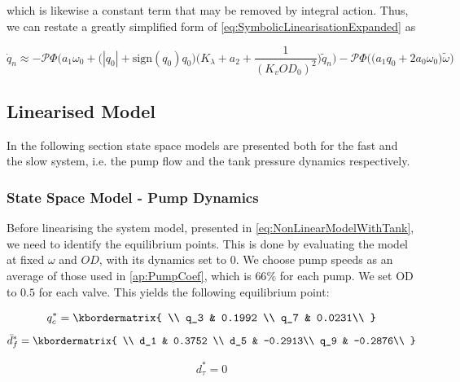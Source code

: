 which is likewise a constant term that may be removed by integral action. Thus, we can restate a greatly simplified form of \cref{eq:SymbolicLinearisationExpanded} as

\begin{equation}\label{eq:SymbolicLinearisationSimplified}
	\dot{q}_n \approx -\mathcal{P}\Phi\Bigg(a_1\omega_0 + \Big(|q_0|+\text{sign}(q_0)q_0\Big)\Bigg(K_\lambda + a_2 + \frac{1}{(K_v OD_0)^2}\Bigg) \tilde{q}_n \Bigg) -  \mathcal{P}\Phi\Bigg(\Big(a_1 q_0 + 2a_0\omega_0\Big) \tilde{\omega}\Bigg)
\end{equation}

\subsection{Linearised Model} \label{sec:LinearisedModel}
In the following section state space models are presented both for the fast and the slow system, i.e. the pump flow and the tank pressure dynamics respectively. 

\subsubsection{State Space Model - Pump Dynamics}
Before linearising the system model, presented in \cref{eq:NonLinearModelWithTank}, we need to identify the equilibrium points. This is done by evaluating the model at fixed $ \omega $ and $ OD $, with its dynamics set to $0$. We choose pump speeds as an average of those used in \cref{ap:PumpCoef}, which is $ 66\% $ for each pump. We set OD to $ 0.5 $ for each valve. This yields the following equilibrium point:

	\begin{equation}
	q_c^* = \kbordermatrix{
		\\
		q_3 & 0.1992 \\ 
		q_7 & 0.0231\\
	}
\end{equation}
	\begin{equation}
	\bar{d}_f^* = \kbordermatrix{
		\\
		d_1 & 0.3752 \\ 
		d_5 & -0.2913\\
		q_9 & -0.2876\\
	}
	\end{equation}

\begin{equation}
	d_\tau^* = 0
\end{equation}


